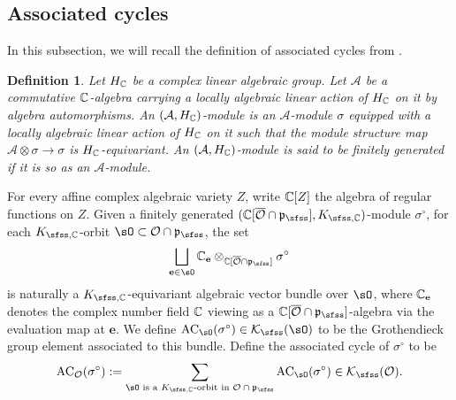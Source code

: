 \documentclass[12pt,a4paper]{amsart}
\newcommand{\CA}{{\mathcal {A}}}
\newcommand{\CK}{{\mathcal {K}}}
\newcommand{\CO}{{\mathcal {O}}}
\newcommand{\oS}{\operatorname{S}}
\newcommand{\p}{\mathfrak p}
\numberwithin{equation}{section}
\newtheorem{defn}[thm]{Definition}
\theoremstyle{remark}
\begin{document}
\subsection{Associated cycles}%

In this subsection, we will recall the definition of associated cycles from \cite{Vo89}.
\begin{defn}\label{spkmodule}
 Let $H_{\mathbb{C}}$ be a complex linear algebraic group. Let $\CA$ be a commutative $\mathbb{C}$-algebra carrying a locally algebraic linear action of $H_{\mathbb{C}}$ on it by algebra automorphisms. 
  An $(\CA, H_\C)$-module is an  $\CA$-module 
$
  \sigma
$
equipped with a locally algebraic linear action of $H_{\mathbb{C}}$ on it such that 
the module structure map 
$
  \CA\otimes \sigma\rightarrow \sigma
$
is $H_{\mathbb{C}}$-equivariant. An $(\CA, H_\C)$-module is said to be finitely generated if it is so as an $\CA$-module. 

\end{defn}



For every affine complex algebraic variety $Z$, write $\mathbb{C}[Z]$ the algebra of regular functions on $Z$. 
Given a finitely generated $(\C[\overline \CO\cap \p_\sfss], K_{\sfss, \C})$-module $\sigma^\circ$, for each $K_{\sfss, \C}$-orbit $\sO\subset \CO\cap \p_\sfss$, the set
\[
  \bigsqcup_{\mathbf e\in \sO} \C_\mathbf e\otimes_{\C[\overline \CO\cap \p_\sfss]}\sigma^\circ
\]
is naturally a $K_{\sfss, \C}$-equivariant algebraic vector bundle over $\sO$, where $\mathbb{C}_\mathbf e$  denotes the complex number field $\mathbb{C}$ viewing as a $\C[\overline \CO\cap \p_\sfss]$-algebra via the evaluation map at $\mathbf e$. We define $\mathrm{AC}_\sO(\sigma^\circ)\in \CK_\sfss(\sO)$ to be the Grothendieck group element associated to this bundle. Define the  associated cycle of $\sigma^\circ$ to be
\[
  \mathrm{AC}_\CO(\sigma^\circ):=\sum_{\sO\textrm{ is a   $K_{\sfss, \C}$-orbit in $ \CO\cap \p_\sfss$}} \mathrm{AC}_\sO(\sigma^\circ)\in \CK_\sfss(\CO). 
\]
\end{document}
